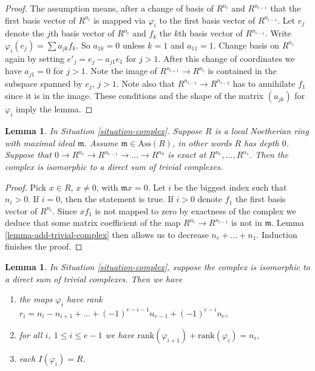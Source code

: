 \documentclass{amsart}
\theoremstyle{plain}
\newtheorem{lemma}[subsection]{Lemma}
\theoremstyle{definition}
\theoremstyle{remark}
\numberwithin{equation}{subsection}
\begin{document}
\begin{proof}
The assumption means, after a change of basis of
$R^{n_i}$ and $R^{n_{i-1}}$ that the first basis
vector of $R^{n_i}$ is mapped via $\varphi_i$ to the first basis
vector of $R^{n_{i-1}}$. Let $e_j$ denote the
$j$th basis vector of $R^{n_i}$ and $f_k$ the $k$th
basis vector of $R^{n_{i-1}}$. Write $\varphi_i(e_j)
= \sum a_{jk} f_k$. So $a_{1k} = 0$ unless $k = 1$
and $a_{11} = 1$. Change basis on $R^{n_i}$ again
by setting $e'_j = e_j - a_{j1} e_1$ for $j > 1$.
After this change of coordinates we have $a_{j1} = 0$
for $j > 1$. Note the image
of $R^{n_{i + 1}} \to R^{n_i}$ is contained in the
subspace spanned by $e_j$, $j > 1$. Note also
that $R^{n_{i-1}} \to R^{n_{i-2}}$ has to annihilate
$f_1$ since it is in the image. These conditions
and the shape of the matrix $(a_{jk})$ for $\varphi_i$
imply the lemma.
\end{proof}


\begin{lemma}
\label{lemma-exact-depth-zero-local}
In Situation \ref{situation-complex}. Suppose $R$ is
a local Noetherian ring with maximal ideal $\mathfrak m$.
Assume $\mathfrak m \in \text{Ass}(R)$, in other words
$R$ has depth $0$. Suppose that
$0 \to R^{n_e} \to R^{n_{e-1}} \to \ldots \to R^{n_0}$
is exact at $R^{n_e}, \ldots, R^{n_1}$.
Then the complex is isomorphic to a direct sum of trivial
complexes.
\end{lemma}

\begin{proof}
Pick $x \in R$, $x \not = 0$, with $\mathfrak m x = 0$.
Let $i$ be the biggest index such that $n_i > 0$.
If $i = 0$, then the statement is true. If
$i > 0$ denote $f_1$ the first basis vector of $R^{n_i}$.
Since $xf_1$ is not mapped to zero by
exactness of the complex we deduce that some matrix
coefficient of the map $R^{n_i} \to R^{n_{i - 1}}$
is not in $\mathfrak m$.
Lemma \ref{lemma-add-trivial-complex} then allows
us to decrease $n_e + \ldots + n_1$. Induction finishes the proof.
\end{proof}


\begin{lemma}
\label{lemma-trivial-case-exact}
In Situation \ref{situation-complex}, suppose the complex is
isomorphic to a direct sum of trivial complexes. Then
we have
\begin{enumerate}
\item the maps $\varphi_i$ have rank
$r_i = n_i - n_{i + 1} + \ldots + (-1)^{e-i-1} n_{e-1} + (-1)^{e-i} n_e$,
\item for all $i$, $1 \leq i \leq e - 1$ we have
$\text{rank}(\varphi_{i + 1}) + \text{rank}(\varphi_i) = n_i$,
\item each $I(\varphi_i) = R$.
\end{enumerate}
\end{lemma}
\end{document}
